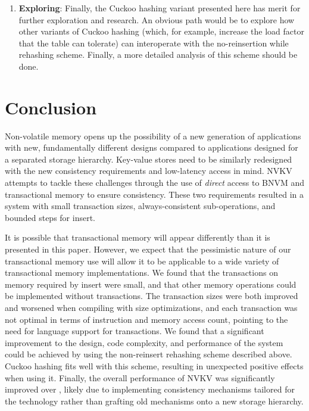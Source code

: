 \begin{enumerate}
\item \textbf{Exploring}: Finally, the Cuckoo hashing variant presented here has
merit for further exploration and research. An obvious path would be to explore
how other variants of Cuckoo hashing (which, for example, increase the load factor that
the table can tolerate) can interoperate with the no-reinsertion while rehashing
scheme. Finally, a more detailed analysis of this scheme should be done.

\end{enumerate}

\section{Conclusion}

Non-volatile memory opens up the possibility of a new generation of applications
with new, fundamentally different designs compared to applications designed for
a separated storage hierarchy. Key-value stores need to be similarly redesigned
with the new consistency requirements and low-latency access in mind. NVKV
attempts to tackle these challenges through the use of \textit{direct} access to
BNVM and transactional memory to ensure consistency. These two requirements
resulted in a system with small transaction sizes, always-consistent
sub-operations, and bounded steps for insert.

It is possible that transactional memory will appear differently than it is
presented in this paper. However, we expect that the pessimistic nature of our
transactional memory use will allow it to be applicable to a wide variety of
transactional memory implementations. We found that the transactions on memory
required by insert were small, and that other memory operations could be
implemented without transactions. The transaction sizes were both improved and
worsened when compiling with size optimizations, and each transaction was not
optimal in terms of instruction and memory access count, pointing to the need
for language support for transactions. We found that a significant improvement
to the design, code complexity, and performance of the system could be
achieved by using the non-reinsert rehashing scheme described above. Cuckoo
hashing fits well with this scheme, resulting in unexpected positive effects
when using it. Finally, the overall performance of NVKV was significantly
improved over \bdb, likely due to implementing consistency mechanisms tailored
for the technology rather than grafting old mechanisms onto a new storage hierarchy.



